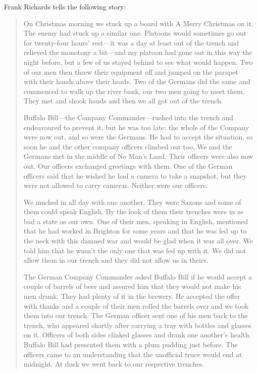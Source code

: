 Frank Richards tells the following story:


\begin{quote}
On Christmas morning we stuck up a board with \QENOpen{}A Merry Christmas\QENClose{} on it. The enemy had stuck up a similar one. Platoons would sometimes go out for twenty-four hours’ rest—it was a day at least out of the trench and relieved the monotony a bit—and my platoon had gone out in this way the night before, but a few of us stayed behind to see what would happen. Two of our men then threw their equipment off and jumped on the parapet with their hands above their heads. Two of the Germans did the same and commenced to walk up the river bank, our two men going to meet them. They met and shook hands and then we all got out of the trench.

Buffalo Bill—the Company Commander—rushed into the trench and endeavoured to prevent it, but he was too late: the whole of the Company were now out, and so were the Germans. He had to accept the situation, so soon he and the other company officers climbed out too. We and the Germans met in the middle of No Man’s Land. Their officers were also now out. Our officers exchanged greetings with them. One of the German officers said that he wished he had a camera to take a snapshot, but they were not allowed to carry cameras. Neither were our officers.

We mucked in all day with one another. They were Saxons and some of them could speak English. By the look of them their trenches were in as bad a state as our own. One of their men, speaking in English, mentioned that he had worked in Brighton for some years and that he was fed up to the neck with this damned war and would be glad when it was all over. We told him that he wasn’t the only one that was fed up with it. We did not allow them in our trench and they did not allow us in theirs.

The German Company Commander asked Buffalo Bill if he would accept a couple of barrels of beer and assured him that they would not make his men drunk. They had plenty of it in the brewery. He accepted the offer with thanks and a couple of their men rolled the barrels over and we took them into our trench. The German officer sent one of his men back to the trench, who appeared shortly after carrying a tray with bottles and glasses on it. Officers of both sides clinked glasses and drank one another’s health. Buffalo Bill had presented them with a plum pudding just before. The officers came to an understanding that the unofficial truce would end at midnight. At dusk we went back to our respective trenches.


\end{quote}
